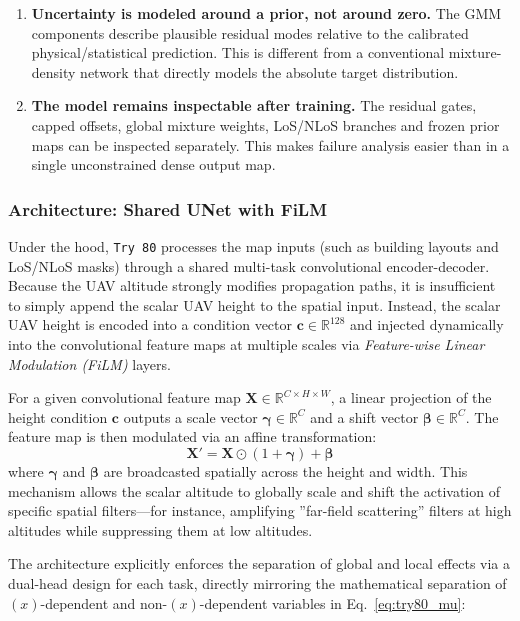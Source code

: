 \documentclass[11pt,a4paper]{article}
\begin{document}
\begin{enumerate}
\item \textbf{Uncertainty is modeled around a prior, not around zero.}
      The GMM components describe plausible residual modes relative to the
      calibrated physical/statistical prediction. This is different from a
      conventional mixture-density network that directly models the absolute
      target distribution.

\item \textbf{The model remains inspectable after training.}
      The residual gates, capped offsets, global mixture weights, LoS/NLoS
      branches and frozen prior maps can be inspected separately. This makes
      failure analysis easier than in a single unconstrained dense output map.
\end{enumerate}

\subsubsection{Architecture: Shared UNet with FiLM}

Under the hood, \texttt{Try 80} processes the map inputs (such as building layouts and LoS/NLoS masks) through a shared multi-task convolutional encoder-decoder. Because the UAV altitude strongly modifies propagation paths, it is insufficient to simply append the scalar UAV height to the spatial input. Instead, the scalar UAV height is encoded into a condition vector $\mathbf{c} \in \mathbb{R}^{128}$ and injected dynamically into the convolutional feature maps at multiple scales via \emph{Feature-wise Linear Modulation (FiLM)} layers. 

For a given convolutional feature map $\mathbf{X} \in \mathbb{R}^{C \times H \times W}$, a linear projection of the height condition $\mathbf{c}$ outputs a scale vector $\boldsymbol{\gamma} \in \mathbb{R}^C$ and a shift vector $\boldsymbol{\beta} \in \mathbb{R}^C$. The feature map is then modulated via an affine transformation:
\begin{equation}
\mathbf{X}' = \mathbf{X} \odot (1 + \boldsymbol{\gamma}) + \boldsymbol{\beta}
\label{eq:film}
\end{equation}
where $\boldsymbol{\gamma}$ and $\boldsymbol{\beta}$ are broadcasted spatially across the height and width. This mechanism allows the scalar altitude to globally scale and shift the activation of specific spatial filters—for instance, amplifying ''far-field scattering'' filters at high altitudes while suppressing them at low altitudes.

The architecture explicitly enforces the separation of global and local effects via a dual-head design for each task, directly mirroring the mathematical separation of $(x)$-dependent and non-$(x)$-dependent variables in Eq.~\ref{eq:try80_mu}:
\end{document}
